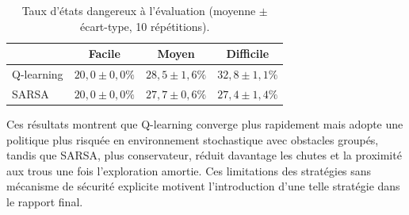 \documentclass{article}
\begin{document}
\begin{table}[ht]
  \centering
  \caption{Taux d'états dangereux à l'évaluation (moyenne $\pm$ écart-type, 10 répétitions).}
  \label{tab:danger}
  \small
  \begin{tabular}{lccc}
    \toprule
    & \textbf{Facile} & \textbf{Moyen} & \textbf{Difficile} \\
    \midrule
    Q-learning & $20{,}0 \pm 0{,}0\%$ & $28{,}5 \pm 1{,}6\%$ & $32{,}8 \pm 1{,}1\%$ \\
    SARSA      & $20{,}0 \pm 0{,}0\%$ & $27{,}7 \pm 0{,}6\%$ & $27{,}4 \pm 1{,}4\%$ \\
    \bottomrule
  \end{tabular}
\end{table}

Ces résultats montrent que Q-learning converge plus rapidement mais adopte une politique plus risquée en environnement stochastique avec obstacles groupés, tandis que SARSA, plus conservateur, réduit davantage les chutes et la proximité aux trous une fois l'exploration amortie. Ces limitations des stratégies sans mécanisme de sécurité explicite motivent l'introduction d'une telle stratégie dans le rapport final.



\end{document}
